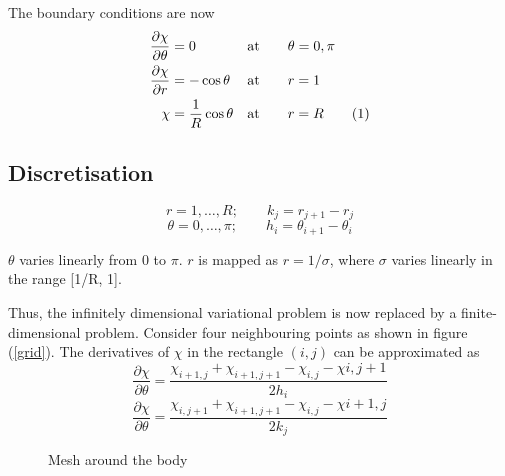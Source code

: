 \documentclass[a4paper]{article}
\newcommand\numberthis{\addtocounter{equation}{1}\tag{\theequation}}
\begin{document}
	The boundary conditions are now
	\begin{align*}
	\frac{\partial\chi}{\partial\theta}&=0 &\text{at} \qquad  &\theta=0,\pi \\
	\frac{\partial\chi}{\partial r}&=-\cos \theta &\text{at} \qquad  &r=1 \\	
	\chi &=\frac{1}{R}\cos \theta &\text{at} \qquad  &r=R \numberthis \label{bcs}
	\end{align*}

	\subsection{Discretisation}
	
	$$r = 1,\ldots,R; \qquad  k_j = r_{j+1} - r_j $$
	$$\theta = 0,\ldots,\pi; \qquad h_i = \theta_{i+1} - \theta_i  $$	
	
	$\theta$ varies linearly from $0$ to $\pi$. $r$ is mapped as $r=1/\sigma$, where $\sigma$ varies linearly in the range [1/R, 1]. 	
	
	Thus, the infinitely dimensional variational problem is now replaced by a finite-dimensional problem. Consider four neighbouring points as shown in figure (\ref{grid}). The derivatives of $\chi$ in the rectangle $(i,j)$ can be approximated as
	$$
	\frac{\partial \chi}{\partial \theta} = 
	\frac{\chi_{i+1,j}+\chi_{i+1,j+1}-\chi_{i,j}-\chi{i,j+1}}{2h_i}
	$$
	$$
	\frac{\partial \chi}{\partial \theta} = 
	\frac{\chi_{i,j+1}+\chi_{i+1,j+1}-\chi_{i,j}-\chi{i+1,j}}{2k_j}
	$$
	
	
	
	
	
	\begin{figure}
		\centering
  		\caption{Mesh around the body}
	\end{figure}		
	
\end{document}
